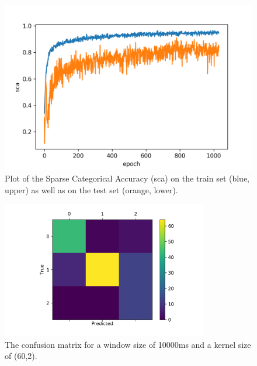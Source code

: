 \documentclass[runningheads]{llncs}
\begin{document}
\begin{figure}
\vspace{-5mm}
\centering
\includegraphics[width=\textwidth]{accuracy_plot.png}
\caption{Plot of the Sparse Categorical Accuracy (sca) on the train set (blue, upper) as well as on the test set (orange, lower).}
\label{fig4}	
\end{figure} 

\begin{figure}
\centering 
\includegraphics[width=0.8\textwidth]{confusionmatrix.png}
\caption{The confusion matrix for a window size of 10000ms and a kernel size of (60,2).}
\label{fig3}	
\end{figure}
\end{document}
